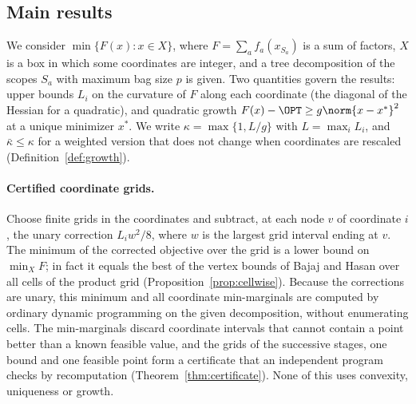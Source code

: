 \subsection{Main results}
We consider $\min\{F(x):x\in X\}$, where $F=\sum_af_a(x_{S_a})$ is a sum of
factors, $X$ is a box in which some coordinates are integer, and a tree
decomposition of the scopes $S_a$ with maximum bag size $p$ is given. Two
quantities govern the results: upper bounds $L_i$ on the curvature of $F$ along
each coordinate (the diagonal of the Hessian for a quadratic), and quadratic
growth $F(x)-\OPT\ge g\norm{x-x^*}^2$ at a unique minimizer $x^*$. We write
$\kappa=\max\{1,L/g\}$ with $L=\max_iL_i$, and $\bar\kappa\le\kappa$ for a
weighted version that does not change when coordinates are rescaled
(Definition~\ref{def:growth}).

\paragraph{Certified coordinate grids.}
Choose finite grids in the coordinates and subtract, at each node $v$ of
coordinate $i$, the unary correction $L_iw^2/8$, where $w$ is the largest grid
interval ending at $v$. The minimum of the corrected objective over the grid is
a lower bound on $\min_XF$; in fact it equals the best of the vertex bounds of
Bajaj and Hasan \cite{BajajHasan2020} over all cells of the product grid
(Proposition~\ref{prop:cellwise}). Because the corrections are unary, this
minimum and all coordinate min-marginals are computed by ordinary dynamic
programming on the given decomposition, without enumerating cells. The
min-marginals discard coordinate intervals that cannot contain a point better
than a known feasible value, and the grids of the successive stages, one
bound and one feasible point form a certificate that an independent program
checks by recomputation (Theorem~\ref{thm:certificate}). None of this uses
convexity, uniqueness or growth.

